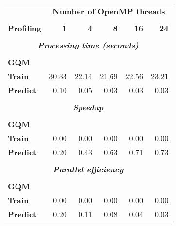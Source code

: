 \begin{tabular}{lrrrrr}\toprule											
	&	\multicolumn{5}{c}{\textbf{Number of OpenMP threads}}									\\
\cline{2-6}\vspace{-8pt}	&		&		&		&		&		\\
\textbf{Profiling}	&	\textbf{1}	&	\textbf{4}	&	\textbf{8}	&	\textbf{16}	&	\textbf{24}	\vspace{1pt}\\
\toprule\vspace{-10pt}	&		&		&		&		&		\\
\multicolumn{6}{c}{\textbf{\textit{Processing time (seconds)}}}											\\
\midrule[0.1pt]\vspace{-10pt}	&		&		&		&		&		\\
\textbf{GQM}	&	\color{blue}{0.02}	&	\color{red}{0.01}	&	\color{red}{0.00}	&	\color{red}{0.00}	&	\color{red}{0.00}	\\
\textbf{Train}	&	30.33	&	22.14	&	21.69	&	22.56	&	23.21	\\
\textbf{Predict}	&	0.10	&	0.05	&	0.03	&	0.03	&	0.03	\\
\toprule\vspace{-10pt}	&		&		&		&		&		\\
\multicolumn{6}{c}{\textbf{\textit{Speedup}}}											\\
\midrule[0.1pt]\vspace{-10pt}	&		&		&		&		&		\\
\textbf{GQM}	&	\color{blue}{1.00}	&	\color{red}{3.11}	&	\color{red}{5.39}	&	\color{red}{7.43}	&	\color{red}{9.77}	\\
\textbf{Train}	&	0.00	&	0.00	&	0.00	&	0.00	&	0.00	\\
\textbf{Predict}	&	0.20	&	0.43	&	0.63	&	0.71	&	0.73	\\
\toprule\vspace{-10pt}	&		&		&		&		&		\\
\multicolumn{6}{c}{\textbf{\textit{Parallel efficiency}}}											\\
\midrule[0.1pt]\vspace{-10pt}	&		&		&		&		&		\\
\textbf{GQM}	&	\color{blue}{1.00}	&	\color{red}{0.78}	&	\color{red}{0.67}	&	\color{red}{0.46}	&	\color{red}{0.41}	\\
\textbf{Train}	&	0.00	&	0.00	&	0.00	&	0.00	&	0.00	\\
\textbf{Predict}	&	0.20	&	0.11	&	0.08	&	0.04	&	0.03	\\
\bottomrule											
\end{tabular}											
